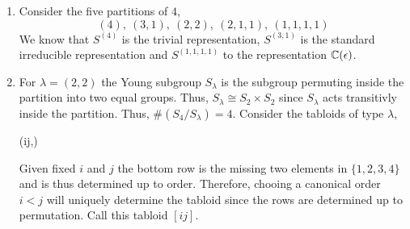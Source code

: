 \documentclass[12pt]{extarticle}
\begin{document}
\begin{enumerate}
\item Consider the five partitions of $4$,
\[ (4), \: (3 , 1), \: (2, 2), \: (2 , 1, 1), \: (1, 1, 1, 1) \]
We know that $S^(4)$ is the trivial representation, $S^{(3, 1)}$ is the standard irreducible representation and $S^{(1, 1, 1, 1)}$ to the representation $\mathbb{C}(\epsilon)$. 

\item For $\lambda = (2, 2)$ the Young subgroup $S_\lambda$ is the subgroup permuting inside the partition into two equal groups. Thus, $S_{\lambda} \cong S_2 \times S_2$ since $S_\lambda$ acts transitivly inside the partition. Thus, $\#(S_4 / S_{\lambda}) = 4$. Consider the tabloids of type $\lambda$, 
\begin{center}
\young(ij,\bullet\bullet)
\end{center}
Given fixed $i$ and $j$ the bottom row is the missing two elements in $\{1, 2, 3, 4\}$ and is thus determined up to order. Therefore, chooing a canonical order $i < j$ will uniquely determine the tabloid since the rows are determined up to permutation. Call this tabloid $[ij]$. 


\end{enumerate}
\end{document}
